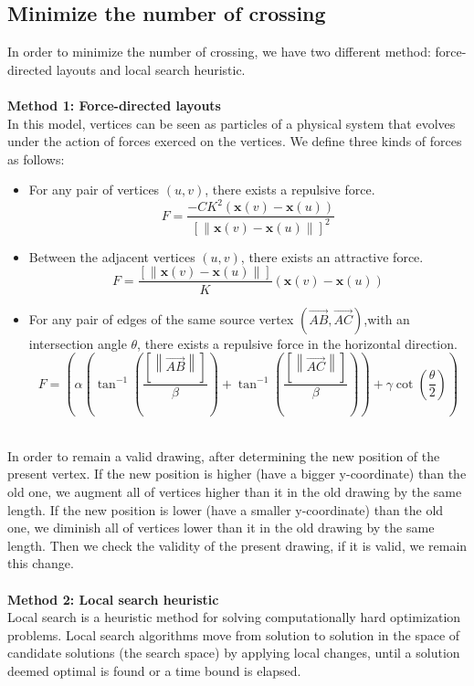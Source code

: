 \documentclass[utf8, a4paper, 12pt]{article}
\begin{document}
\subsection{Minimize the number of crossing}
In order to minimize the number of crossing, we have two different method: force-directed layouts and local search heuristic.\\
~\\
\textbf{Method 1: Force-directed layouts}\\
\indent In this model, vertices can be seen as particles of a physical system that evolves under the action of forces exerced on the vertices. We define three kinds of forces as follows:
\begin{itemize}
\item For any pair of vertices $(u,v)$, there exists a repulsive force.
$$F=\frac{-CK^{2}(\mathbf{x}(v)-\mathbf{x}(u))}{{ \left[ \left\| \mathbf{x}(v)-\mathbf{x}(u) \right\|\right]  }^{2}}$$

\item Between the adjacent vertices $(u,v)$, there exists an attractive force.
$$F=\frac{\left[ \left\| \mathbf{x}(v)-\mathbf{x}(u) \right\| \right] }{K}(\mathbf{x}(v)-\mathbf{x}(u))$$   

\item For any pair of edges of the same source vertex $(\vec{AB},\vec{AC})$,with an intersection angle $\theta$,  there exists a repulsive force in the horizontal direction.
$$F=(\alpha({\tan}^{-1}(\frac{\left[ \left\|\vec{AB}\right\| \right]}{\beta})+{\tan}^{-1}(\frac{\left[  \left\|\vec{AC}\right\| \right] }{\beta}))+\gamma \cot(\frac{\theta}{2}))$$

\end{itemize}
~\\
\indent In order to remain a valid drawing, after determining the new position of the present vertex. If the new position is higher (have a bigger y-coordinate) than the old one, we augment all of vertices higher than it in the old drawing by the same length.  If the new position is lower (have a smaller y-coordinate) than the old one, we diminish all of vertices lower than it in the old drawing by the same length. Then we check the validity of the present drawing, if it is valid, we remain this change.  \\
~\\
\textbf{Method 2: Local search heuristic}\\
\indent Local search is a heuristic method for solving computationally hard optimization problems. Local search algorithms move from solution to solution in the space of candidate solutions (the search space) by applying local changes, until a solution deemed optimal is found or a time bound is elapsed.\\
\end{document}
